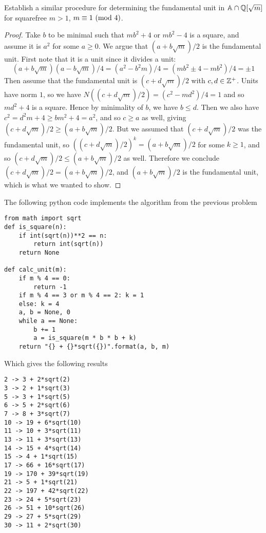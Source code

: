 \documentclass[11pt]{article}
\begin{document}
Establish a similar procedure for determining the fundamental unit in $\mathbb{A} \cap \mathbb{Q}[\sqrt{m}]$ for squarefree $m > 1$, $m \equiv 1\ (\text{mod}\ 4)$.

\begin{proof}
  Take $b$ to be minimal such that $mb^2+4$ or $mb^2-4$ is a square, and assume it is $a^2$ for some $a \ge 0$.
  We argue that $(a + b\sqrt{m})/2$ is the fundamental unit.
  First note that it is a unit since it divides a unit:
  \begin{equation*}
    (a+b\sqrt{m})(a-b\sqrt{m})/4
    = (a^2 - b^2m)/4 = (mb^2 \pm 4 - mb^2)/4 = \pm 1
  \end{equation*}
  Then assume that the fundamental unit is $(c + d\sqrt{m})/2$ with $c,d \in \mathbb{Z}^+$.
  Units have norm $1$, so we have $N((c+d\sqrt{m})/2) = (c^2 - md^2)/4 = 1$ and so $md^2 + 4$ is a square.
  Hence by minimality of $b$, we have $b \le d$.
  Then we also have $c^2 = d^2m + 4 \ge bm^2 + 4 = a^2$, and so $c \ge a$ as well, giving $(c + d\sqrt{m})/2 \ge (a + b\sqrt{m})/2$.
  But we assumed that $(c + d\sqrt{m})/2$ was the fundamental unit, so $((c+d\sqrt{m})/2)^k = (a + b\sqrt{m})/2$ for some $k \ge 1$, and so $(c + d\sqrt{m})/2 \le (a + b\sqrt{m})/2$ as well.
  Therefore we conclude $(c + d\sqrt{m})/2 = (a + b\sqrt{m})/2$, and $(a + b\sqrt{m})/2$ is the fundamental unit, which is what we wanted to show.
\end{proof}


The following python code implements the algorithm from the previous problem
\begin{verbatim}
from math import sqrt
def is_square(n):
    if int(sqrt(n))**2 == n:
        return int(sqrt(n))
    return None

def calc_unit(m):
    if m % 4 == 0:
        return -1
    if m % 4 == 3 or m % 4 == 2: k = 1
    else: k = 4
    a, b = None, 0
    while a == None:
        b += 1
        a = is_square(m * b * b + k)
    return "{} + {}*sqrt({})".format(a, b, m)
\end{verbatim}
Which gives the following results
\begin{verbatim}
2 -> 3 + 2*sqrt(2)
3 -> 2 + 1*sqrt(3)
5 -> 3 + 1*sqrt(5)
6 -> 5 + 2*sqrt(6)
7 -> 8 + 3*sqrt(7)
10 -> 19 + 6*sqrt(10)
11 -> 10 + 3*sqrt(11)
13 -> 11 + 3*sqrt(13)
14 -> 15 + 4*sqrt(14)
15 -> 4 + 1*sqrt(15)
17 -> 66 + 16*sqrt(17)
19 -> 170 + 39*sqrt(19)
21 -> 5 + 1*sqrt(21)
22 -> 197 + 42*sqrt(22)
23 -> 24 + 5*sqrt(23)
26 -> 51 + 10*sqrt(26)
29 -> 27 + 5*sqrt(29)
30 -> 11 + 2*sqrt(30)
\end{verbatim}
\end{document}
